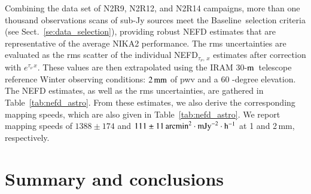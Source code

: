 \documentclass[traditionalabstract]{aa}
\newcommand{\trentemetre}{30-$\rm{m}$}
\newcommand{\baseline}{Baseline}%
\newcommand{\taunu}{\tau_{\nu}}
\begin{document}
{Combining the data set of N2R9, N2R12, and N2R14 campaigns, more than one
thousand observations scans of sub-Jy sources meet the \baseline\ selection
criteria (see Sect.~\ref{se:data_selection}), providing robust NEFD estimates
that are representative of the average NIKA2 performance. The rms
uncertainties are evaluated as the rms scatter of the individual
NEFD$_{\taunu,\, x}$ estimates after correction with
$e^{\taunu\,x}$. 
These values are then extrapolated using the IRAM
\trentemetre\ telescope reference Winter observing conditions: $2\,\rm{mm}$ of
 pwv and a $60$ -degree elevation. The NEFD
estimates, as well as the rms uncertainties, are gathered in
Table~\ref{tab:nefd_astro}.
From these estimates, we also derive the corresponding mapping speeds,
which are also given in Table~\ref{tab:nefd_astro}.
We report mapping speeds of $1388 \pm 174$ and
$111 \pm 11 \, \rm{arcmin}^2\cdot \rm{mJy}^{-2}\cdot \rm{h}^{-1}$ at 1
and 2\,mm, respectively. 




\section{Summary and conclusions}
\label{se:summary}

}
\end{document}
